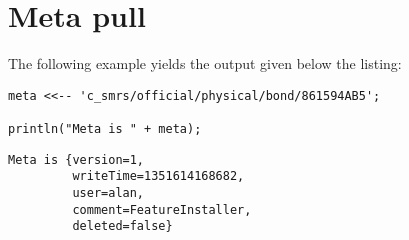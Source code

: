 \section{Meta pull}

The following example yields the output given below the listing:
\begin{lstlisting}[caption={Meta pull}]
meta <<-- 'c_smrs/official/physical/bond/861594AB5';

println("Meta is " + meta);
\end{lstlisting}

\begin{Verbatim}
Meta is {version=1,
         writeTime=1351614168682,
         user=alan,
         comment=FeatureInstaller,
         deleted=false}
\end{Verbatim}
